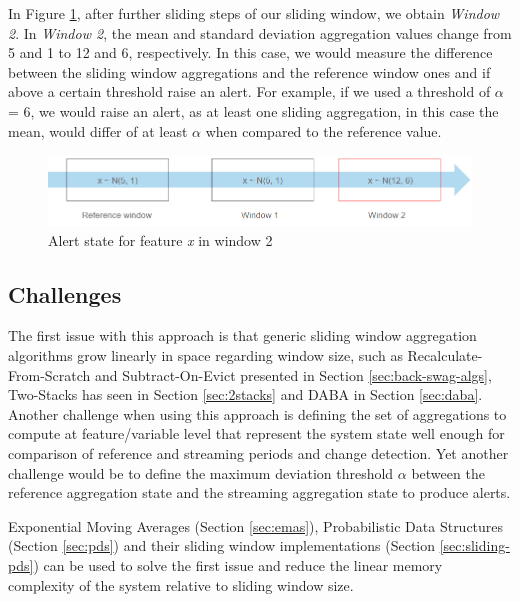 In Figure \ref{fig:approach2-alert-state}, after further sliding steps of our sliding window, we obtain \textit{Window 2}. In \textit{Window 2}, the mean and standard deviation aggregation values change from 5 and 1 to 12 and 6, respectively. In this case, we would measure the difference between the sliding window aggregations and the reference window ones and if above a certain threshold raise an alert. For example, if we used a threshold of $\alpha$ = 6, we would raise an alert, as at least one sliding aggregation, in this case the mean, would differ of at least $\alpha$ when compared to the reference value.

\begin{figure}[!htb]
    \begin{center}
      \includegraphics[scale=0.65]{figures/approach2-alert.png}
      \caption[]{Alert state for feature \textit{x} in window 2}
      \label{fig:approach2-alert-state}
    \end{center}
\end{figure}

\subsection*{Challenges}
The first issue with this approach is that generic sliding window aggregation algorithms grow linearly in space regarding window size, such as Recalculate-From-Scratch and Subtract-On-Evict presented in Section \ref{sec:back-swag-algs}, Two-Stacks has seen in Section \ref{sec:2stacks} and DABA in Section \ref{sec:daba}. Another challenge when using this approach is defining the set of aggregations to compute at feature/variable level that represent the system state well enough for comparison of reference and streaming periods and change detection. Yet another challenge would be to define the maximum deviation threshold $\alpha$  between the reference aggregation state and the streaming aggregation state to produce alerts.


Exponential Moving Averages (Section \ref{sec:emas}), Probabilistic Data Structures (Section \ref{sec:pds}) and their sliding window implementations (Section \ref{sec:sliding-pds}) can be used to solve the first issue and reduce the linear memory complexity of the system relative to sliding window size. 

